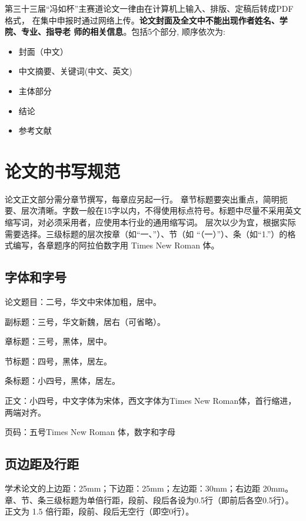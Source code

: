 \documentclass[zihao=-4]{ctexart}
\begin{document}
\begin{spacing}{1.5}
  第三十三届“冯如杯”主赛道论文一律由在计算机上输入、排版、定稿后转成PDF格式，
在集中申报时通过网络上传。\textbf{论文封面及全文中不能出现作者姓名、学院、专业、指导老
师的相关信息}。包括5个部分, 顺序依次为: \par 
  \begin{itemize}
    \item 封面（中文）
    \item 中文摘要、关键词(中文、英文)
    \item 主体部分
    \item 结论
    \item 参考文献
  \end{itemize}

\section{论文的书写规范}

论文正文部分需分章节撰写，每章应另起一行。
章节标题要突出重点，简明扼要、层次清晰。字数一般在15字以内，不得使用标点符号。标题中尽量不采用英文缩写词，对必须采用者，应使用本行业的通用缩写词。  层次以少为宜，根据实际需要选择。三级标题的层次按章（如“一、”）、节（如 “（一）”）、条（如“1.”）的格式编写，各章题序的阿拉伯数字用 Times New Roman 体。  

\subsection{字体和字号}
论文题目：二号，华文中宋体加粗，居中。

副标题：三号，华文新魏，居右（可省略）。

章标题：三号，黑体，居中。

节标题：四号，黑体，居左。

条标题：小四号，黑体，居左。

正文：小四号，中文字体为宋体，西文字体为Times New Roman体，首行缩进，两端对齐。

页码：五号Times New Roman 体，数字和字母\par

\subsection{页边距及行距}
学术论文的上边距：25mm；下边距：25mm；左边距：30mm；右边距 20mm。
章、节、条三级标题为单倍行距，段前、段后各设为0.5行（即前后各空0.5行）。
正文为 1.5 倍行距，段前、段后无空行（即空0行）。


\end{spacing}
\end{document}
